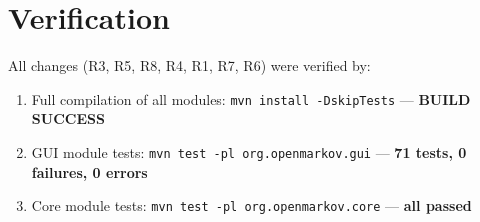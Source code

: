 \documentclass[12pt,a4paper]{article}
\newcommand{\code}[1]{\texttt{#1}}
\begin{document}
\section{Verification}
\label{sec:verification}

All changes (R3, R5, R8, R4, R1, R7, R6) were verified by:

\begin{enumerate}
  \item Full compilation of all modules:
        \code{mvn install -DskipTests} --- \textbf{BUILD SUCCESS}
  \item GUI module tests:
        \code{mvn test -pl org.openmarkov.gui} ---
        \textbf{71 tests, 0 failures, 0 errors}
  \item Core module tests:
        \code{mvn test -pl org.openmarkov.core} ---
        \textbf{all passed}
\end{enumerate}
\end{document}
